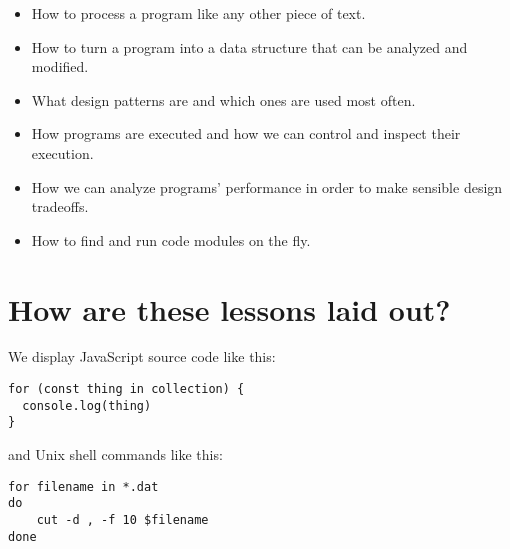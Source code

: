 \documentclass[krantzl]{krantz}
\begin{document}
\begin{itemize}

\item 

How to process a program like any other piece of text.



\item 

How to turn a program into a data structure that can be analyzed and modified.



\item 

What design patterns are and which ones are used most often.



\item 

How programs are executed and how we can control and inspect their execution.



\item 

How we can analyze programs' performance in order to make sensible design tradeoffs.



\item 

How to find and run code modules on the fly.



\end{itemize}


\newpage

\section{How are these lessons laid out?}\label{introduction-layout}


We display JavaScript source code like this:

\begin{lstlisting}[frame=single,frameround=tttt]
for (const thing in collection) {
  console.log(thing)
}
\end{lstlisting}


\noindent and Unix shell commands like this:

\begin{lstlisting}[frame=single,frameround=tttt]
for filename in *.dat
do
    cut -d , -f 10 $filename
done
\end{lstlisting}
\end{document}
